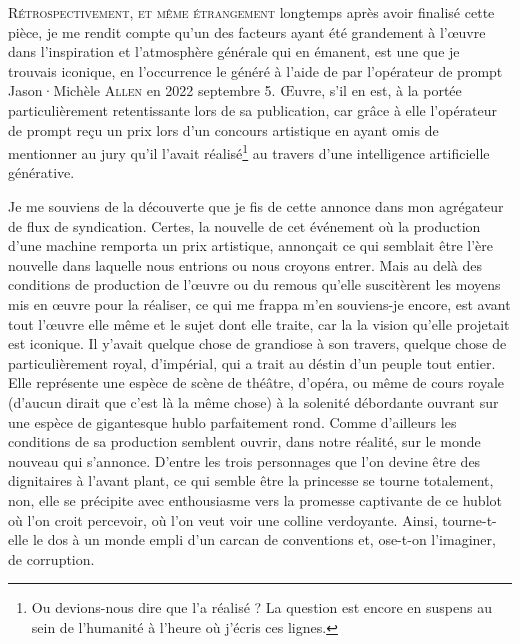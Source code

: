 \lettrine[lines=3]{R}{étrospectivement, et même étrangement}
 longtemps après avoir finalisé cette pièce, je me rendit compte qu’un des facteurs ayant été grandement à l’œuvre dans l’inspiration et l’atmosphère générale qui en émanent, est une  que je trouvais iconique, en l’occurrence le  généré à l’aide de  par l’opérateur de prompt Jason·Michèle \textsc{Allen} en 2022 septembre 5. Œuvre, s’il en est, à la portée particulièrement retentissante lors de sa publication, car grâce à elle l’opérateur de prompt reçu un prix lors d’un concours artistique en ayant omis de mentionner au jury qu’il l’avait réalisé\footnote{Ou devions-nous dire que  l’a réalisé ? La question est encore en suspens au sein de l’humanité à l’heure où j’écris ces lignes.} au travers d’une intelligence artificielle générative.


Je me souviens de la découverte que je fis de cette annonce dans mon agrégateur de flux de syndication. Certes, la nouvelle de cet événement où la production d’une machine remporta un prix artistique, annonçait ce qui semblait être l’ère nouvelle dans laquelle nous entrions ou nous croyons entrer. Mais au delà des conditions de production de l’œuvre ou du remous qu’elle suscitèrent les moyens mis en œuvre pour la réaliser, ce qui me frappa m’en souviens-je encore, est avant tout l’œuvre elle même et le sujet dont elle traite, car la la vision qu’elle projetait est iconique. Il y’avait quelque chose de grandiose à son travers, quelque chose de particulièrement royal, d’impérial, qui a trait au déstin d’un peuple tout entier. Elle représente une espèce de scène de théâtre, d’opéra, ou même de cours royale (d’aucun dirait que c’est là la même chose) à la solenité débordante ouvrant sur une espèce de gigantesque hublo parfaitement rond. Comme d’ailleurs les conditions de sa production semblent ouvrir, dans notre réalité, sur le monde nouveau qui s’annonce.
D’entre les trois personnages que l’on devine être des dignitaires à l’avant plant, ce qui semble être la princesse se tourne totalement, non, elle se précipite avec enthousiasme vers la promesse captivante de ce hublot où l’on croit percevoir, où l’on veut voir une colline verdoyante. Ainsi, tourne-t-elle le dos à un monde empli d’un carcan de conventions et, ose-t-on l’imaginer, de corruption.

